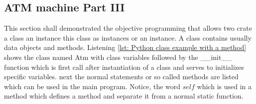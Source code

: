\subsection{ATM machine Part III}\label{subsec: ATM machine Part III}
This section shall demonstrated the objective programming that allows two crate a class an instance this class as instances or an instance. A class contains usually data objects and methods. Listening \ref{lst: Python class example with a method} shows the class named Atm with class variables followed by the \_\_init\_\_ function which is first call after instantiation of a class and serves to initializes specific variables. next the normal statements or so called methods are listed which can be used in the main program. Notice, the word $self$ which is used in a method which defines a method and separate it from a normal static function.

